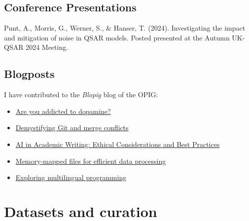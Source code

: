 \section*{Conference Presentations}
Punt, A., Morris, G., Werner, S., \& Hanser, T. (2024). Investigating the impact and mitigation of noise in QSAR models. Posted presented at the Autumn UK-QSAR 2024 Meeting.


\section*{Blogposts}

I have contributed to the \textit{Blopig} blog of the OPIG:

\begin{itemize}
    \item \href{https://www.blopig.com/blog/2025/10/are-you-addicted-to-dopamine/}{Are you addicted to dopamine?}
    \item \href{https://www.blopig.com/blog/2025/05/demystifying-git-and-merge-conflicts/}{Demystifying Git and merge conflicts}
    \item \href{https://www.blopig.com/blog/2025/03/ai-in-academic-writing-ethical-considerations-and-best-practices/}{AI in Academic Writing: Ethical Considerations and Best Practices}
    \item \href{https://www.blopig.com/blog/2024/08/memory-mapped-files-for-efficient-data-processing/}{Memory-mapped files for efficient data processing}
    \item \href{https://www.blopig.com/blog/2024/04/exploring-multilingual-programming/}{Exploring multilingual programming}
\end{itemize}


\appendix

\chapter{Datasets and curation}\label{app:datasets}



